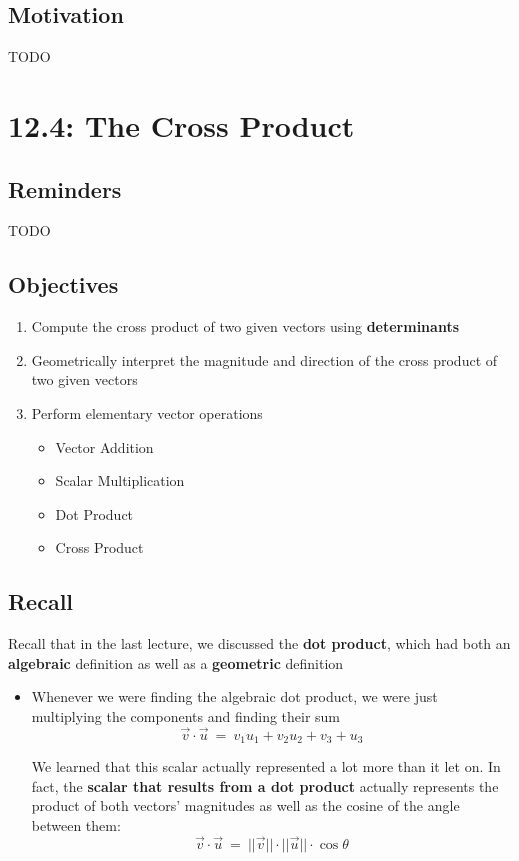 \documentclass{report}
\begin{document}
\begin{sloppypar}
\section{Motivation}
TODO
\chapter{12.4: The Cross Product}
\section{Reminders}
TODO
\section{Objectives}
\begin{enumerate}
  \item Compute the cross product of two given
        vectors using \textbf{determinants}
  \item Geometrically interpret the
        magnitude and direction of the cross product
        of two given vectors
  \item Perform elementary vector operations
        \begin{itemize}
          \item Vector Addition
          \item Scalar Multiplication
          \item Dot Product
                \item Cross Product
        \end{itemize}

\end{enumerate}

\section{Recall}
Recall that in the last lecture, we discussed the
\textbf{dot product}, which had both an \textbf{algebraic}
definition as well as a \textbf{geometric} definition
\begin{itemize}
  \item Whenever we were finding the algebraic
        dot product, we were just multiplying the components
        and finding their sum
        \[ \vec{v} \cdot \vec{u} ~ = ~
        v_{1}u_{1} + v_{2}u_{2} + v_{3}+u_{3} \]

        We learned that this scalar actually represented
        a lot more than it let on. In fact, the
        \textbf{scalar that results from a dot product}
        actually represents the product of both vectors'
        magnitudes as well as the cosine of the angle
        between them:
        \[ \vec{v} \cdot \vec{u} ~ = ~
        || \vec{v} || \cdot || \vec{u} || \cdot
        \cos{\theta} \]


\end{itemize}
\end{sloppypar}
\end{document}
